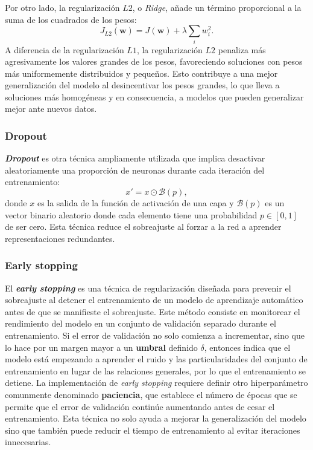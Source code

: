 Por otro lado, la regularización $L2$, o \textit{Ridge}, añade un término proporcional a la suma de los cuadrados de los pesos:
\[
J_{L2}(\mathbf{w}) = J(\mathbf{w}) + \lambda \sum_{i} w_i^2.
\]
A diferencia de la regularización $L1$, la regularización $L2$ penaliza más agresivamente los valores grandes de los pesos, favoreciendo soluciones con pesos más uniformemente distribuidos y pequeños. Esto contribuye a una mejor generalización del modelo al desincentivar los pesos grandes, lo que lleva a soluciones más homogéneas y en consecuencia, a modelos que pueden generalizar mejor ante nuevos datos.

\subsubsection{Dropout}

\textbf{\textit{Dropout}} es otra técnica ampliamente utilizada que implica desactivar aleatoriamente una proporción de neuronas durante cada iteración del entrenamiento:
\begin{equation}
	x' = x \odot \mathcal{B}(p),
\end{equation}
donde $x$ es la salida de la función de activación de una capa y $\mathcal{B}(p)$ es un vector binario aleatorio donde cada elemento tiene una probabilidad $p \in [0,1]$ de ser cero. Esta técnica reduce el sobreajuste al forzar a la red a aprender representaciones redundantes.

\subsubsection{Early stopping}

El \textbf{\textit{early stopping}} es una técnica de regularización diseñada para prevenir el sobreajuste al detener el entrenamiento de un modelo de aprendizaje automático antes de que se manifieste el sobreajuste. Este método consiste en monitorear el rendimiento del modelo en un conjunto de validación separado durante el entrenamiento. Si el error de validación no solo comienza a incrementar, sino que lo hace por un margen mayor a un \textbf{umbral} definido \(\delta\), entonces indica que el modelo está empezando a aprender el ruido y las particularidades del conjunto de entrenamiento en lugar de las relaciones generales, por lo que el entrenamiento se detiene. La implementación de \textit{early stopping} requiere definir otro hiperparámetro comunmente denominado \textbf{paciencia}, que establece el número de épocas que se permite que el error de validación continúe aumentando antes de cesar el entrenamiento. Esta técnica no solo ayuda a mejorar la generalización del modelo sino que también puede reducir el tiempo de entrenamiento al evitar iteraciones innecesarias.

